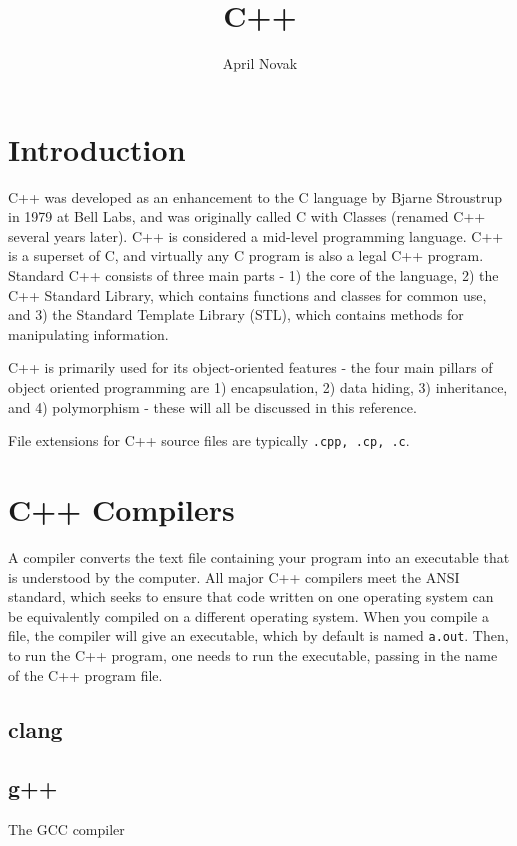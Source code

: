 \documentclass[10pt]{article}
\title{C++}
\author{April Novak}
\begin{document}
\maketitle
\section{Introduction}

C++ was developed as an enhancement to the C language by Bjarne Stroustrup in 1979 at Bell Labs, and was originally called C with Classes (renamed C++ several years later). C++ is considered a mid-level programming language. C++ is a superset of C, and virtually any C program is also a legal C++ program. Standard C++ consists of three main parts - 1) the core of the language, 2) the C++ Standard Library, which contains functions and classes for common use, and 3) the Standard Template Library (STL), which contains methods for manipulating information.

C++ is primarily used for its object-oriented features - the four main pillars of object oriented programming are 1) encapsulation, 2) data hiding, 3) inheritance, and 4) polymorphism - these will all be discussed in this reference.

File extensions for C++ source files are typically \texttt{.cpp, .cp, .c}.

\section{C++ Compilers}

A compiler converts the text file containing your program into an executable that is understood by the computer. All major C++ compilers meet the ANSI standard, which seeks to ensure that code written on one operating system can be equivalently compiled on a different operating system. When you compile a file, the compiler will give an executable, which by default is named \texttt{a.out}. Then, to run the C++ program, one needs to run the executable, passing in the name of the C++ program file. 

\subsection{clang}

\subsection{g++}

The GCC compiler
\end{document}
